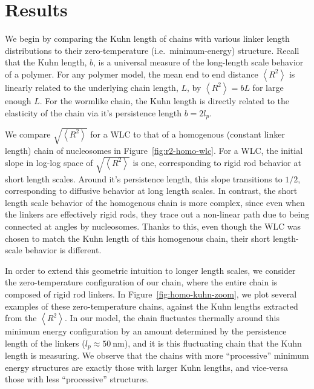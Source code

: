 \documentclass[%
 reprint,
superscriptaddress,
showpacs,preprintnumbers,
 amsmath,amssymb,
 aps,
 prl,
]{revtex4-1}
\newcommand{\RR}{\left\langle{}R^2\right\rangle{}}
\begin{document}
\section{\label{sec:results}Results}
We begin by comparing the Kuhn length of chains with various linker length
    distributions to their zero-temperature (i.e.\ minimum-energy) structure.
Recall that the Kuhn length, $b$, is a universal measure of the long-length
    scale behavior of a polymer.
For any polymer model, the mean end to end distance $\RR$ is linearly related to the
    underlying chain length, $L$, by $\RR = bL$ for large enough $L$.
For the wormlike chain, the Kuhn length is directly related to the elasticity of
    the chain via it's persistence length $b = 2l_p$.

We compare $\sqrt{\RR}$ for a WLC to that of a homogenous (constant linker
    length) chain of nucleosomes in Figure~\ref{fig:r2-homo-wlc}.
For a WLC, the initial slope in log-log space of $\sqrt{\RR}$ is one,
    corresponding to rigid rod behavior at short length scales.
Around it's persistence length, this slope transitions to $1/2$, corresponding
    to diffusive behavior at long length scales.
In contrast, the short length scale behavior of the homogenous chain is more
    complex, since even when the linkers are effectively rigid rods, they trace
    out a non-linear path due to being connected at angles by nucleosomes.
Thanks to this, even though the WLC was chosen to match the Kuhn length of this
    homogenous chain, their short length-scale behavior is different.

In order to extend this geometric intuition to longer length scales, we consider
    the zero-temperature configuration of our chain, where the entire chain is
    composed of rigid rod linkers.
In Figure~\ref{fig:homo-kuhn-zoom}, we plot several examples of these
    zero-temperature chains, against the Kuhn lengths extracted from the $\RR$.
In our model, the chain fluctuates thermally around this minimum energy
    configuration by an amount determined by the persistence length of the
    linkers ($l_p \approx \SI{50}{\nano\metre}$), and it is this fluctuating
    chain that the Kuhn length is measuring.
We observe that the chains with more ``processive'' minimum energy structures
    are exactly those with larger Kuhn lengths, and vice-versa those with less
    ``processive'' structures.
\end{document}
